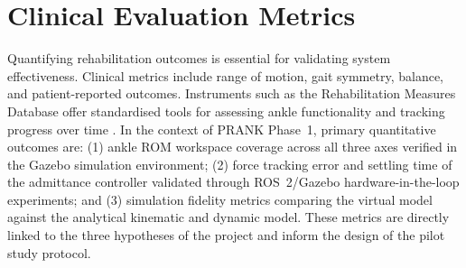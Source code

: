 %
%


\section{Clinical Evaluation Metrics}

Quantifying rehabilitation outcomes is essential for validating system effectiveness.
Clinical metrics include range of motion, gait symmetry, balance, and patient-reported outcomes.
Instruments such as the Rehabilitation Measures Database offer standardised tools for assessing ankle functionality and tracking progress over time \cite{sralab2024}.
In the context of PRANK Phase~1, primary quantitative outcomes are: (1) ankle ROM workspace coverage across all three axes verified in the Gazebo simulation environment; (2) force tracking error and settling time of the admittance controller validated through ROS~2/Gazebo hardware-in-the-loop experiments; and (3) simulation fidelity metrics comparing the virtual model against the analytical kinematic and dynamic model.
These metrics are directly linked to the three hypotheses of the project and inform the design of the pilot study protocol.
